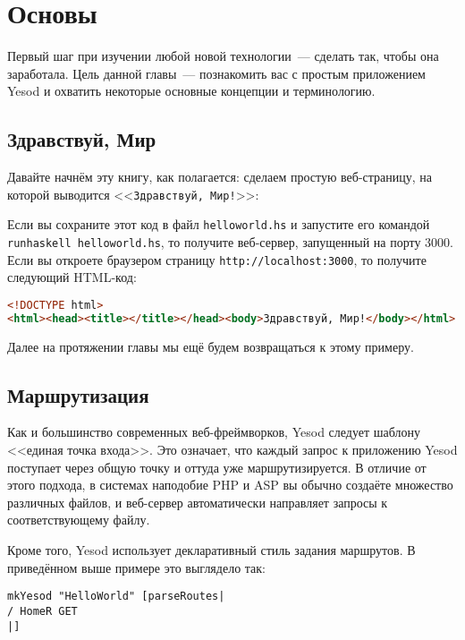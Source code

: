 \chapter{Основы}\label{chap:basics}

Первый шаг при изучении любой новой технологии~--- сделать так, чтобы она заработала. Цель
данной главы~--- познакомить вас с простым приложением Yesod и охватить некоторые основные
концепции и терминологию.

\section{Здравствуй, Мир}

Давайте начнём эту книгу, как полагается: сделаем простую веб-страницу, на которой
выводится <<\texttt{Здравствуй, Мир!}>>:

Если вы сохраните этот код в файл \lstinline!helloworld.hs! и запустите его командой
\lstinline!runhaskell helloworld.hs!, то получите веб-сервер, запущенный на порту 3000.
Если вы откроете браузером страницу \lstinline'http://localhost:3000', то получите
следующий HTML-код:

\begin{lstlisting}[language=HTML]
<!DOCTYPE html>
<html><head><title></title></head><body>Здравствуй, Мир!</body></html>
\end{lstlisting}

Далее на протяжении главы мы ещё будем возвращаться к этому примеру.

\section{Маршрутизация}

Как и большинство современных веб-фреймворков, Yesod следует шаблону <<единая точка
входа>>. Это означает, что каждый запрос к приложению Yesod поступает через общую точку и
оттуда уже маршрутизируется. В отличие от этого подхода, в системах наподобие PHP и ASP вы
обычно создаёте множество различных файлов, и веб-сервер автоматически направляет запросы
к соответствующему файлу.

Кроме того, Yesod использует декларативный стиль задания маршрутов. В приведённом выше
примере это выглядело так:

\begin{lstlisting}
mkYesod "HelloWorld" [parseRoutes|
/ HomeR GET
|]
\end{lstlisting}

